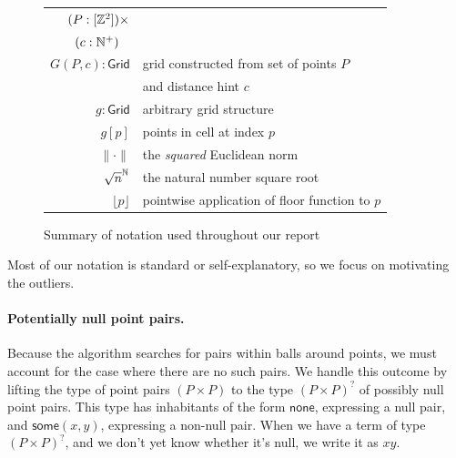 \documentclass{article}
\begin{document}
\begin{figure}[H]
\begin{center}
\begin{tabular} {|| r | l ||}
  $(P : [\mathbb{Z}^2]) \times$ & \\
  $(c : \N^+){\color{white}\times}$ & \\
  \hline
  $G(P, c) : \mathsf{Grid}$ & grid constructed from set of points $P$ \\
  & and distance hint $c$ \\
  \hline
  $g : \mathsf{Grid}$ & arbitrary grid structure \\
  \hline
  $g[p]$ & points in cell at index $p$ \\
  \hline
  $\| \cdot \|$ & the \textit{squared} Euclidean norm \\
  \hline
  $\sqrt{n}^{\mathbb{N}}$ & the natural number square root \\
  \hline
  $\lfloor p \rfloor$ & pointwise application of floor function to $p$ \\
  \hline
\end{tabular}
\end{center}
\caption{Summary of notation used throughout our report}
\end{figure}

Most of our notation is standard or self-explanatory, so we focus on motivating the outliers.

\paragraph{Potentially null point pairs.}
Because the algorithm searches for pairs within balls around points, we must account for the case where there are no such pairs.
We handle this outcome by lifting the type of point pairs $(P \times P)$ to the type $(P \times P)^?$ of possibly null point pairs.
This type has inhabitants of the form $\mathsf{none}$, expressing a null pair, and $\mathsf{some}(x, y)$, expressing a non-null pair.
When we have a term of type $(P \times P)^?$, and we don't yet know whether it's null, we write it as $x\!y$.

\end{document}
